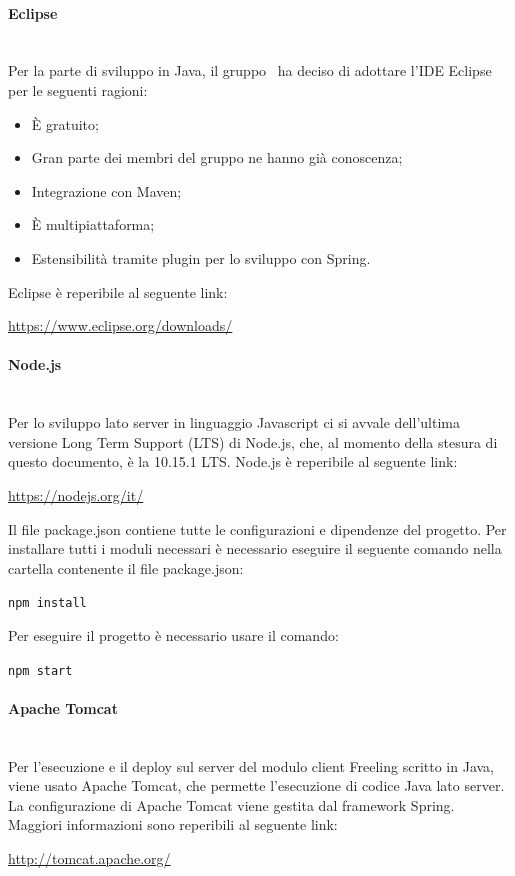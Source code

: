 \paragraph{Eclipse}\mbox{}\\
Per la parte di sviluppo in Java, il gruppo \gruppo \ ha deciso di adottare l'IDE Eclipse per le seguenti ragioni:
\begin{itemize}
	\item \`E gratuito;
	\item Gran parte dei membri del gruppo ne hanno già conoscenza;
	\item Integrazione con Maven;
	\item \`E multipiattaforma;
	\item Estensibilità tramite plugin per lo sviluppo con Spring.
\end{itemize}
Eclipse è reperibile al seguente link:\newline
\begin{center}
	\url{https://www.eclipse.org/downloads/}
\end{center}

\paragraph{Node.js}\mbox{}\\
Per lo sviluppo lato server in linguaggio Javascript ci si avvale dell'ultima versione Long Term Support (LTS) di Node.js, che, al momento della stesura di questo documento, è la 10.15.1 LTS.
Node.js è reperibile al seguente link:
\begin{center}
	\url{https://nodejs.org/it/}
\end{center} 
Il file package.json contiene tutte le configurazioni e dipendenze del progetto. Per installare tutti i moduli necessari è necessario eseguire il seguente comando nella cartella contenente il file package.json:
\begin{center}
	\texttt{npm install}
\end{center}
Per eseguire il progetto è necessario usare il comando:
\begin{center}
	\texttt{npm start}
\end{center}

\paragraph{Apache Tomcat}\mbox{}\\
Per l'esecuzione e il deploy sul server del modulo client Freeling scritto in Java, viene usato Apache Tomcat, che permette l'esecuzione di codice Java lato server. La configurazione di Apache Tomcat viene gestita dal framework Spring.
Maggiori informazioni sono reperibili al seguente link:\newline
\begin{center}
	\url{http://tomcat.apache.org/}
\end{center}

